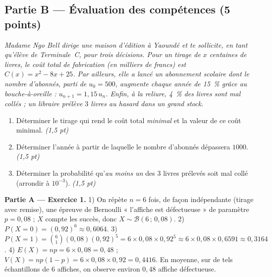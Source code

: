 \subsection*{Partie B — Évaluation des compétences \hfill (5 points)}

\noindent\textit{Madame Ngo Bell dirige une maison d'édition à Yaoundé et te sollicite, en
tant qu'élève de Terminale~C, pour trois décisions. Pour un tirage de $x$ centaines de
livres, le coût total de fabrication (en milliers de francs) est
$C(x)=x^2-8x+25$. Par ailleurs, elle a lancé un abonnement scolaire dont le nombre
d'abonnés, parti de $u_0=500$, augmente chaque année de \SI{15}{\percent} grâce au
bouche-à-oreille : $u_{n+1}=1{,}15\,u_n$. Enfin, à la reliure, \SI{4}{\percent} des livres
sont mal collés ; un libraire prélève $3$ livres au hasard dans un grand stock.}

\begin{enumerate}[label=\textbf{Tâche \arabic*.},leftmargin=2.4em]
\item Déterminer le tirage qui rend le coût total \emph{minimal} et la valeur de ce coût
minimal. \hfill\textit{(1,5 pt)}
\item Déterminer l'année à partir de laquelle le nombre d'abonnés dépassera $1000$. \hfill\textit{(1,5 pt)}
\item Déterminer la probabilité qu'\emph{au moins un} des $3$ livres prélevés soit mal
collé (arrondir à $10^{-3}$). \hfill\textit{(1,5 pt)}
\end{enumerate}
\par{}


\noindent\textbf{Partie A — Exercice 1.}
1) On répète $n=6$ fois, de façon indépendante (tirage avec remise), une épreuve de
Bernoulli « l'affiche est défectueuse » de paramètre $p=0{,}08$ ; $X$ compte les succès,
donc $X\sim\mathcal{B}(6\,;\,0{,}08)$.
2) $P(X{=}0)=(0{,}92)^6\approx0{,}6064$.
3) $P(X{=}1)=\binom61(0{,}08)(0{,}92)^5=6\times0{,}08\times0{,}92^5\approx6\times0{,}08\times0{,}6591\approx0{,}3164$.
4) $E(X)=np=6\times0{,}08=0{,}48$ ; $V(X)=np(1-p)=6\times0{,}08\times0{,}92=0{,}4416$.
En moyenne, sur de tels échantillons de $6$ affiches, on observe environ $0{,}48$ affiche
défectueuse.

